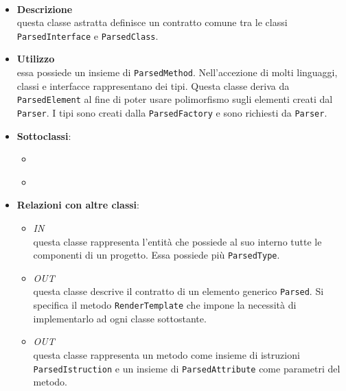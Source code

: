 \paragraph{}
\label{\nogloxy{SWEDesigner::Server::Project::ParsedType}}
\begin{itemize}
\item \textbf{Descrizione}\\
questa classe astratta definisce un contratto comune tra le classi \texttt{ParsedInterface} e \texttt{ParsedClass}. 
\item \textbf{Utilizzo}\\
essa possiede un insieme di \texttt{ParsedMethod}. Nell'accezione di molti linguaggi, classi e interfacce rappresentano dei tipi. Questa classe deriva da \texttt{ParsedElement} al fine di poter usare polimorfismo sugli elementi creati dal \texttt{Parser}. 
I tipi sono creati dalla \texttt{ParsedFactory} e sono richiesti da \texttt{Parser}.
\item \textbf{Sottoclassi}:
\begin{itemize}
\item \hyperref[\nogloxy{SWEDesigner::Server::Project::ParsedClass}]{}
\item \hyperref[\nogloxy{SWEDesigner::Server::Project::ParsedInterface}]{}
\end{itemize}
\item \textbf{Relazioni con altre classi}:
\begin{itemize}
\item \textit{IN} \hyperref[\nogloxy{SWEDesigner::Server::Project::ParsedProgram}]{}\\
questa classe rappresenta l'entità che possiede al suo interno tutte le componenti di un progetto. Essa possiede più \texttt{ParsedType}.
\item \textit{OUT} \hyperref[\nogloxy{SWEDesigner::Server::Project::ParsedElement}]{}\\
questa classe descrive il contratto di un elemento generico \texttt{Parsed}. Si specifica il metodo \texttt{RenderTemplate} che impone la necessità di implementarlo ad ogni classe sottostante.
\item \textit{OUT} \hyperref[\nogloxy{SWEDesigner::Server::Project::ParsedMethod}]{}\\
questa classe rappresenta un metodo come insieme di istruzioni \texttt{ParsedIstruction} e un insieme di \texttt{ParsedAttribute} come parametri del metodo.
\end{itemize}
\end{itemize}

